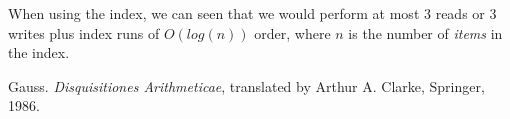 \documentclass[twoside,twocolumn]{article}
\theoremstyle{definition}
\theoremstyle{remark}
\begin{document}
When using the index, we can seen that we would perform at most 3 reads or 3 writes plus index runs of $O(log(n))$ order, where $n$ is the number of 
\emph{items} in the index.



\begin{thebibliography}{99} %

Gauss. \emph{Disquisitiones Arithmeticae}, translated by Arthur A. Clarke, Springer, 1986.

\end{thebibliography}

\end{document}
